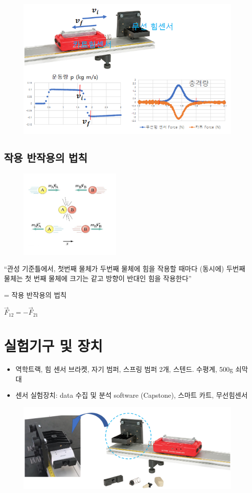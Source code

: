 \documentclass[12pt,a4paper]{article}
\begin{document}
\begin{figure}[h!]
    \centering
    \includegraphics[width=15cm]{W11G3.png}
\end{figure}
\subsection{작용 반작용의 법칙}
\begin{figure}
    \includegraphics[width=5cm]{W11G4.png}
\end{figure}
“관성 기준틀에서, 첫번째 물체가 두번째 물체에 힘을 작용할 때마다 (동시에) 두번째
물체는 첫 번째 물체에 크기는 같고 방향이 반대인 힘을 작용한다”

= 작용 반작용의 법칙

$\vec{F}_12=-\vec{F}_21$
\clearpage
\section{실험기구 및 장치}
\begin{itemize}
    \item 역학트랙, 힘 센서 브라켓, 자기 범퍼, 스프링 범퍼 2개, 스텐드. 수평계,
        500g 쇠막대
    \item 센서 실험장치: data 수집 및 분석 software (Capstone), 스마트 카트,
        무선힘센서
\end{itemize}
\begin{figure}[h!]
    \centering
    \includegraphics[width=15cm]{W11G5.png}
\end{figure}
\end{document}
